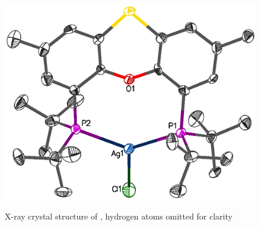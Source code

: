 
\begin{figure}[htbp]
\begin{center}
\vspace{0.5cm}
\includegraphics[scale=0.8]{../Figures/Crystalthixantphossilverchloride.eps}
\caption[X-ray crystal structure of ]{X-ray crystal structure of , hydrogen atoms omitted for clarity}
\vspace{0.2cm}
\label{Crystalthixantphossilverchloride}
\vspace{0.2cm}
\end{center}
\end{figure}
\vspace{0.2cm}

